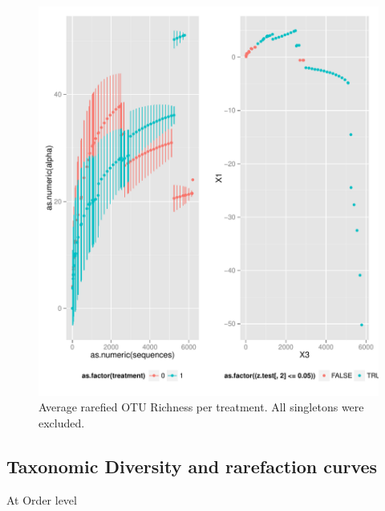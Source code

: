\documentclass[a4paper, 11]{article}\usepackage[]{graphicx}\usepackage[]{color}
\makeatletter
\def\maxwidth{ %
  \ifdim\Gin@nat@width>\linewidth
    \linewidth
  \else
    \Gin@nat@width
  \fi
}
\newenvironment{knitrout}{}{} %
\makeatother
\begin{document}
\begin{knitrout}
\color{fgcolor}\begin{figure}[H]
\includegraphics[width=\maxwidth]{figure/rarefact2a-1} \caption[Average rarefied OTU Richness per treatment]{Average rarefied OTU Richness per treatment. All singletons were excluded.}\label{fig:rarefact2a}
\end{figure}


\end{knitrout}

\subsection{Taxonomic Diversity and rarefaction curves}

At Order level
\end{document}
